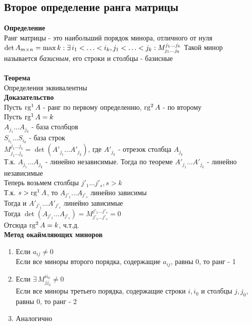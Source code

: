 \documentclass[12pt]{article}
\begin{document}
\subsection{Второе определение ранга матрицы}
\textbf{Определение}\\
Ранг матрицы - это наибольший порядок минора, отличного от нуля\\
$\det A_{m\times n} = \max k: \exists\,i_1 < \ldots < i_k, j_1 < \ldots < j_k: M_{j_1\ldots j_k}^{j_1\ldots j_k}\\$
Такой минор называется \textit{базисным}, его строки и столбцы - базисные\\\\
\textbf{Теорема}\\
Определения эквивалентны\\
\textbf{Доказательство}\\
Пусть $\operatorname{rg}^1 A$ - ранг по первому определению, $\operatorname{rg}^2 A$ - по второму\\
Пусть $\operatorname{rg}^1 A = k$\\
$A_{j_1}\ldots A_{j_k}$ - база столбцов\\
$S_{i_1}\ldots S_{i_k}$ - база строк\\
$M_{j_1\ldots j_k}^{j_1\ldots j_k} = \det (A'_{j_1} \ldots A'_{j_k})$, где $A'_{j_k}$ - отрезок столбца $A_{j_k}$\\
Т.к. $A_{j_1}\ldots A_{j_k}$ - линейно независимые. Тогда по теореме $A'_{j_1}\ldots A'_{j_k}$ - линейно независимые\\
Теперь возьмем столбцы $j'_1\ldots j'_s, s>k$\\
Т.к. $s > \operatorname{rg}^1 A$, то $A_{j'_1}\ldots A_{j'_s}$ линейно зависимы\\
Тогда и $A'_{j'_1}\ldots A'_{j'_s}$ линейно зависимые\\
Тогда $\det (A_{j'_1}\ldots A_{j'_s}) = M_{j'_1\ldots j'_s}^{j'_1\ldots j'_s} = 0$\\
Отсюда $\operatorname{rg}^2 A = k$, ч.т.д.\\
\textbf{Метод окаймляющих миноров}
\begin{enumerate}
    \item Если $a_{ij} \neq 0$\\ Если все миноры второго порядка, содержащие $a_{ij}$, равны 0, то ранг - 1
    \item Если $\exists\,M^{ii_0}_{jj_0} \neq 0$\\Если все миноры третьего порядка, содержащие строки $i,i_0$ и столбцы $j, j_0$, равны 0, то ранг - 2
    \item Аналогично
\end{enumerate}
\end{document}
